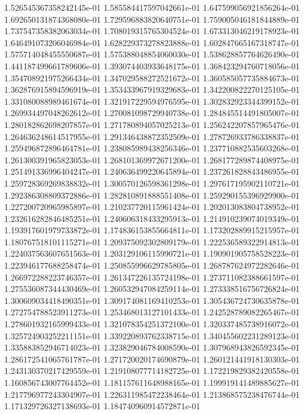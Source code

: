 1.526545367358242145e-01
1.585584417597042661e-01
1.647599056921856264e-01
1.692650131874368080e-01
1.729596883820640751e-01
1.759005046181844889e-01
1.737547358382063034e-01
1.708019315765304524e-01
1.673313046219178923e-01
1.646491073206046984e-01
1.628229373278823888e-01
1.602847665167318747e-01
1.575714048455550687e-01
1.575388048854060030e-01
1.538628857764626490e-01
1.441187499661789606e-01
1.393074403933648175e-01
1.368423294760718056e-01
1.354708921975266434e-01
1.347029588272521672e-01
1.360585057735884673e-01
1.362876915894596919e-01
1.353433967919329683e-01
1.342200822270125105e-01
1.331080088989461674e-01
1.321917229594976595e-01
1.302832923344399152e-01
1.269934497048262612e-01
1.270081098729940738e-01
1.284845514491805007e-01
1.280182862698207857e-01
1.271780894057025213e-01
1.256242207857965476e-01
1.264636248614517955e-01
1.291346438872352509e-01
1.278726933786338837e-01
1.259496872896464781e-01
1.238085989438256346e-01
1.237710882535603268e-01
1.261300391965823053e-01
1.268101369972671200e-01
1.268177289874408975e-01
1.251491336996404247e-01
1.240636499220645894e-01
1.237261828843486955e-01
1.259728369269838832e-01
1.300570126598361298e-01
1.297617195902110721e-01
1.292386308809372886e-01
1.282810891888551408e-01
1.259290155396929900e-01
1.227200720965985897e-01
1.210237720115961424e-01
1.202013083804738952e-01
1.232616282846485251e-01
1.240606318433295913e-01
1.214910239074019349e-01
1.193917601979733872e-01
1.174836153855664811e-01
1.173202889915215957e-01
1.180767518101115271e-01
1.209375092302809179e-01
1.222536589322914813e-01
1.224037563607651563e-01
1.203129106115990721e-01
1.190901905758528223e-01
1.223946177688258474e-01
1.250855996629785805e-01
1.268787624972282646e-01
1.266972288223746357e-01
1.261347226135724198e-01
1.273711082388661597e-01
1.275536087344430469e-01
1.260532947084259114e-01
1.273338516756726824e-01
1.300609034418490351e-01
1.309174081169410253e-01
1.305436724730635878e-01
1.272754788523911273e-01
1.253468013127101433e-01
1.242528789082265467e-01
1.278601932165999433e-01
1.321078354251372100e-01
1.320337485738916072e-01
1.325724903252211151e-01
1.339220893762338715e-01
1.340455602231289123e-01
1.335883852946714023e-01
1.323829046784008590e-01
1.307968943826592345e-01
1.286172541065761787e-01
1.271720020174690879e-01
1.260121441918130303e-01
1.243130370217429559e-01
1.219108077714182725e-01
1.172219829382420558e-01
1.160856743007764452e-01
1.181157611648988165e-01
1.199919141489885627e-01
1.217796977243304907e-01
1.226311985472238464e-01
1.213868575238476744e-01
1.171329726327138693e-01
1.184740960914572871e-01
